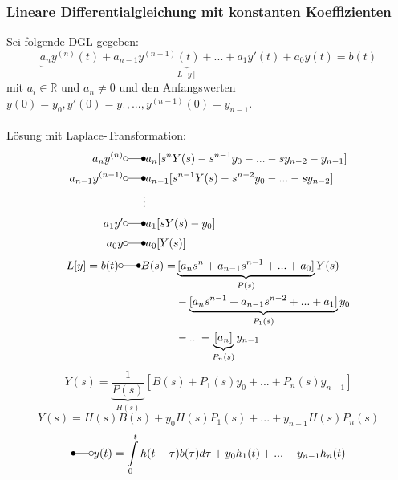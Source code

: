 \documentclass[a4paper,twocolumn,10pt]{article}
\begin{document}
\subsubsection{Lineare Differentialgleichung mit konstanten Koeffizienten}
Sei folgende DGL gegeben:
\begin{equation*}
\underbrace{a_ny^{(n)}(t)+a_{n-1}y^{(n-1)}(t)+...+a_1y'(t)+a_0y(t)}_{L[y]}=b(t)
\end{equation*}
mit $a_i\in\mathbb{R}$ und $a_n\neq 0$ und den Anfangswerten\\
$y(0)=y_0,y'(0)=y_1,...,y^{(n-1)}(0)=y_{n-1}$.\\\\
Lösung mit Laplace-Transformation:
\begin{equation*}
\begin{split}a_ny^{(n)}\laplace &a_n[s^nY(s)-s^{n-1}y_0-...-sy_{n-2}-y_{n-1}] \\ a_{n-1}y^{(n-1)}\laplace & a_{n-1}[s^{n-1}Y(s)-s^{n-2}y_0-...-sy_{n-2}] \\ \vdots \\ a_1y'\laplace &a_1[sY(s)-y_0] \\ a_0y\laplace &a_0[Y(s)]\end{split}
\end{equation*}
\begin{equation*}\begin{split}L[y]=b(t)\laplace B(s)=&\underbrace{[a_ns^n+a_{n-1}s^{n-1}+...+a_0]}_{P(s)}Y(s) \\ &-\underbrace{[a_ns^{n-1}+a_{n-1}s^{n-2}+...+a_1]}_{P_1(s)}y_0 \\ &-...-\underbrace{[a_n]}_{P_n(s)}y_{n-1}\end{split}
\end{equation*}
\begin{equation*}
Y(s)=\underbrace{\frac{1}{P(s)}}_{H(s)}[B(s)+P_1(s)y_0+...+P_n(s)y_{n-1}]
\end{equation*}
\begin{equation*}
Y(s)=H(s)B(s)+y_0H(s)P_1(s)+...+y_{n-1}H(s)P_n(s)
\end{equation*}
\begin{equation*}
\Laplace y(t)=\int\limits_{0}^{t}h(t-\tau)b(\tau)d\tau+y_0h_1(t)+...+y_{n-1}h_n(t)
\end{equation*}
\end{document}
